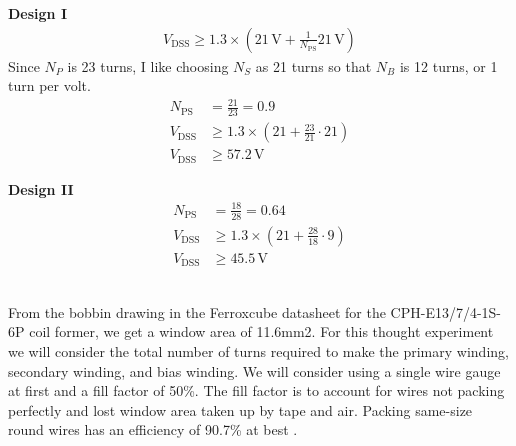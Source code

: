 \documentclass{article}
\begin{document}
\begin{minipage}[t]{0.45\linewidth}
    \textbf{Design I}
    \begin{align*}
    V_\text{DSS} \geq 1.3 \times \left( 21 \, \text{V} + \frac{1}{N_\text{PS}} 21 \, \text{V} \right)
    \end{align*}
    Since \(N_P\) is 23 turns, I like choosing \(N_S\) as 21 turns so that \(N_B\) is 12 turns, or 1 turn per volt.
    \begin{align*}
    N_\text{PS} &= \frac{21}{23} = 0.9 \\
    V_\text{DSS} &\geq 1.3 \times \left( 21 + \frac{23}{21} \cdot 21 \right) \\
    V_\text{DSS} &\geq 57.2 \, \text{V}
    \end{align*}
\end{minipage}
\begin{minipage}[t]{0.45\linewidth}
    \textbf{Design II}
    \begin{align*}
    N_\text{PS} &= \frac{18}{28} = 0.64 \\
    V_\text{DSS} &\geq 1.3 \times \left( 21 + \frac{28}{18} \cdot 9 \right) \\
    V_\text{DSS} &\geq 45.5 \, \text{V}
    \end{align*}
\end{minipage} \\

From the bobbin drawing in the Ferroxcube datasheet for the CPH-E13/7/4-1S-6P coil former, we get a window area of 11.6mm2.  For this thought experiment we will consider the total number of turns required to make the primary winding, secondary winding, and bias winding.  We will consider using a single wire gauge at first and a fill factor of 50\%.  The fill factor is to account for wires not packing perfectly and lost window area taken up by tape and air.  Packing same-size round wires has an efficiency of 90.7\% at best \cite{circle_packing}. \\
\end{document}
